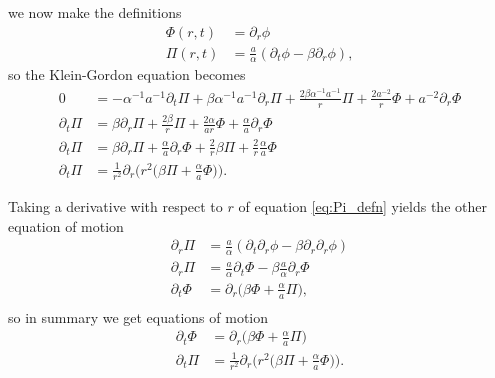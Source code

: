 \documentclass[12pt]{article}
\numberwithin{equation}{section}
\begin{document}
we now make the definitions
\begin{align}
\Phi(r, t) &= \partial_r \phi \label{eq:Phi_defn}\\
\Pi(r, t)  &= \frac{a}{\alpha} (\partial_t \phi - \beta \partial_r \phi), \label{eq:Pi_defn}
\end{align}
so the Klein-Gordon equation becomes
\begin{equation*}
\begin{aligned}
0 &= - \alpha^{-1} a^{-1} \partial_t \Pi + \beta \alpha^{-1} a^{-1} \partial_r \Pi + \frac{2\beta \alpha^{-1} a^{-1}}{r} \Pi + \frac{2a^{-2}}{r} \Phi + a^{-2} \partial_r \Phi \\
\partial_t \Pi &= \beta \partial_r \Pi + \frac{2\beta}{r} \Pi + \frac{2 \alpha}{a r} \Phi + \frac{\alpha}{a} \partial_r \Phi \\
\partial_t \Pi &= \beta \partial_r \Pi + \frac{\alpha}{a} \partial_r \Phi + \frac{2}{r} \beta \Pi + \frac{2}{r} \frac{\alpha}{a} \Phi \\
\partial_t \Pi &= \frac{1}{r^2} \partial_r \Big( r^2 \Big( \beta \Pi + \frac{\alpha}{a} \Phi \Big) \Big).
\end{aligned}
\end{equation*}

Taking a derivative with respect to $r$ of equation \ref{eq:Pi_defn} yields the other equation of motion
\begin{equation*}
\begin{aligned}
\partial_r \Pi &= \frac{a}{\alpha} (\partial_t \partial_r \phi - \beta \partial_r \partial_r \phi) \\
\partial_r \Pi &= \frac{a}{\alpha} \partial_t \Phi - \beta \frac{a}{\alpha} \partial_r \Phi \\
\partial_t \Phi &= \partial_r \Big( \beta \Phi + \frac{\alpha}{a} \Pi \Big), \\
\end{aligned}
\end{equation*}
so in summary we get equations of motion
\begin{align}
\partial_t \Phi &= \partial_r \Big( \beta \Phi + \frac{\alpha}{a} \Pi \Big) \label{eq:Phi_EOM} \\
\partial_t \Pi &= \frac{1}{r^2} \partial_r \Big( r^2 \Big( \beta \Pi + \frac{\alpha}{a} \Phi \Big) \Big). \label{eq:Pi_EOM}
\end{align}
\end{document}
